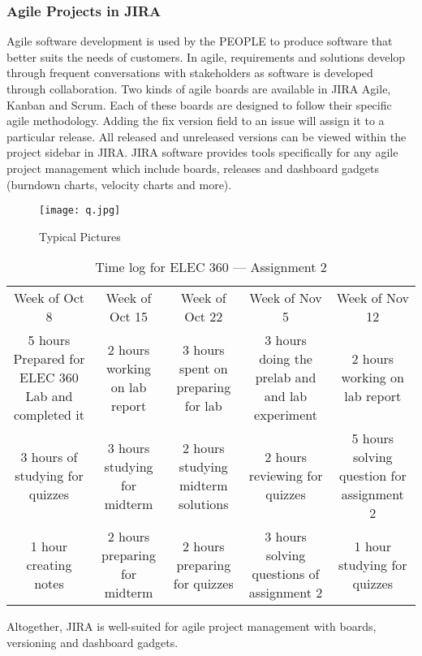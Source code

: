 \subsubsection{Agile Projects in JIRA}
Agile software development is used by the PEOPLE to produce software that better suits the needs of customers. 
In \gls{agile}, requirements and solutions develop through frequent conversations with stakeholders as software is developed through collaboration. Two kinds of agile boards are available in JIRA Agile, Kanban and Scrum. Each of these boards are designed to follow their specific agile methodology. Adding the fix version field to an issue will assign it to a particular release. All released and unreleased versions can be viewed within the project sidebar in JIRA. JIRA software provides tools specifically for any agile project management which include boards, releases and dashboard gadgets (burndown charts, velocity charts and more).

\begin{figure}[H]
	\texttt{[image: q.jpg]}
	\caption{Typical Pictures}
\end{figure}

\begin{table}
	\caption{Time log for ELEC 360 --- Assignment 2}
	\begin{tabular}{c c c c c}
		Week of Oct 8 &                 Week of Oct 15 &                      Week of Oct 22 &                                    Week of Nov 5 &                             Week of Nov 12 \\
		5 hours Prepared for ELEC 360 Lab and completed it &  2 hours working on lab report &  3 hours spent on preparing for lab &  3 hours doing the prelab and and lab experiment &  2 hours working on lab report \\
		3 hours of studying for quizzes &  3 hours studying for midterm &  2 hours studying midterm solutions &  2 hours reviewing for quizzes &  5 hours solving question for assignment 2 \\
		1 hour creating notes &  2 hours preparing for midterm &  2 hours preparing for quizzes &  3 hours solving questions of assignment 2 &  1 hour studying for quizzes \\
	\end{tabular}
\end{table}

Altogether, JIRA is well-suited for \gls{agile} project management with boards, versioning and dashboard gadgets.  

